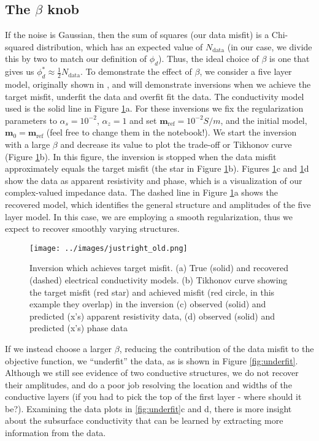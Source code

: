 \documentclass[11pt,oneside]{article}
\begin{document}
\subsection{The $\beta$ knob}

If the noise is Gaussian, then the sum of squares (our data misfit) is a Chi-squared distribution, which has an expected value of $N_\text{data}$ (in our case, we divide this by two to match our definition of $\phi_d$). Thus, the ideal choice of $\beta$ is one that gives us $\phi_d^* \approx \frac{1}{2} N_\text{data}$. To demonstrate the effect of $\beta$, we consider a five layer model, originally shown in \cite{Monographs}, and will demonstrate inversions when we achieve the target misfit, underfit the data and overfit fit the data. The conductivity model used is the solid line in Figure \ref{fig:justright}a. For these inversions we fix the regularization parameters to $\alpha_s = 10^{-2}$, $\alpha_z = 1$ and set $\mathbf{m}_{\text{ref}} = 10^{-2} S/m$, and the initial model, $\mathbf{m}_0 = \mathbf{m}_{\text{ref}}$ (feel free to change them in the notebook!). We start the inversion with a large $\beta$ and decrease its value to plot the trade-off or Tikhonov curve (Figure \ref{fig:justright}b). In this figure, the inversion is stopped when the data misfit approximately equals the  target misfit (the star in Figure \ref{fig:justright}b). Figures \ref{fig:justright}c and \ref{fig:justright}d show the data as apparent resistivity and phase, which is a visualization of our complex-valued impedance data. The dashed line in Figure \ref{fig:justright}a shows the recovered model, which identifies the general structure and amplitudes of the five layer model. In this case, we are employing a smooth regularization, thus we expect to recover smoothly varying structures.



\begin{figure}[htb!]
    \centering
    \texttt{[image: ../images/justright\_old.png]}
\caption{Inversion which achieves target misfit. (a) True (solid) and recovered (dashed) electrical conductivity models. (b) Tikhonov curve showing the target misfit (red star) and achieved misfit (red circle, in this example they overlap) in the inversion (c) observed (solid) and predicted (x’s) apparent resistivity data, (d) observed (solid) and predicted (x’s) phase data}
\label{fig:justright}
\end{figure}

If we instead choose a larger $\beta$, reducing the contribution of the data misfit to the objective function, we ``underfit'' the data, as is shown in Figure \ref{fig:underfit}. Although we still see evidence of two conductive structures, we do not recover their amplitudes, and do a poor job resolving the location and widths of the conductive layers (if you had to pick the top of the first layer - where should it be?). Examining the data plots in \ref{fig:underfit}c and d, there is more insight about the subsurface conductivity that can be learned by extracting more information from the data.
\end{document}
